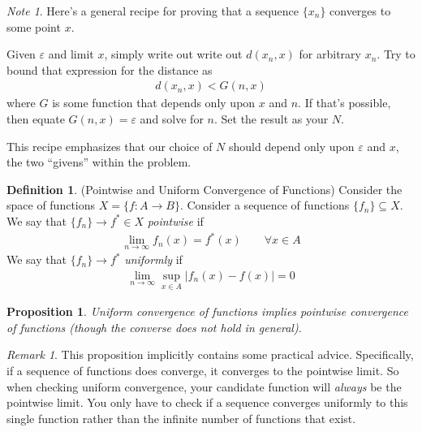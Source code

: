 \documentclass[12pt]{article}
\numberwithin{equation}{section} %
\theoremstyle{plain}
\newtheorem{prop}[thm]{Proposition}
\theoremstyle{definition}
\newtheorem{defn}[thm]{Definition}
\theoremstyle{remark}
\newtheorem*{rmk}{Remark}
\newtheorem*{note}{Note}
\begin{document}
\begin{note}
Here's a general recipe for proving that a sequence $\{x_n\}$ converges
to some point $x$.

Given $\varepsilon$ and limit $x$, simply write out write out $d(x_n,x)$
for arbitrary $x_n$. Try to bound that expression for the distance as
\begin{align*}
  d(x_n,x) < G(n,x)
\end{align*}
where $G$ is some function that depends only upon $x$ and $n$. If that's
possible, then equate $G(n,x)=\varepsilon$ and solve for $n$. Set the
result as your $N$.

This recipe emphasizes that our choice of $N$ should depend only upon
$\varepsilon$ and $x$, the two ``givens'' within the problem.
\end{note}

\begin{defn}{(Pointwise and Uniform Convergence of Functions)}
Consider the space of functions $X=\{f:A\rightarrow B\}$.  Consider a
sequence of functions $\{f_n\}\subseteq X$.  We say that
$\{f_n\}\rightarrow f^* \in X$ \emph{pointwise} if
\begin{align*}
  \lim_{n\rightarrow \infty} f_n(x) = f^*(x)
  \qquad \forall x\in A
\end{align*}
We say that $\{f_n\}\rightarrow f^*$ \emph{uniformly} if
\begin{align*}
  \lim_{n\rightarrow \infty} \sup_{x\in A}
  |f_n(x)-f(x)| = 0
\end{align*}
\end{defn}
\begin{prop}
\label{prop:pwunif}
Uniform convergence of functions implies pointwise convergence of
functions (though the converse does not hold in general).
\end{prop}
\begin{rmk}
This proposition implicitly contains some practical advice.
Specifically, if a sequence of functions does converge, it converges to
the pointwise limit. So when checking uniform convergence, your
candidate function will \emph{always} be the pointwise limit. You only
have to check if a sequence converges uniformly to this single function
rather than the infinite number of functions that exist.
\end{rmk}
\end{document}
